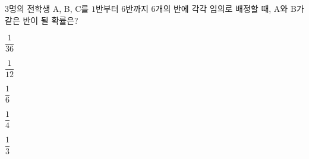 $3$명의 전학생 A, B, C를 $1$반부터 $6$반까지 $6$개의 반에 각각 임의로 배정할 때, A와 B가 같은 반이 될 확률은?
\begin{choices32}{\rule[-3ex]{0pt}{8ex}$\dfrac{1}{36}$}{\rule[-3ex]{0pt}{8ex}$\dfrac{1}{12}$}{\rule[-3ex]{0pt}{8ex}$\dfrac{1}{6}$}{\rule[-3ex]{0pt}{8ex}$\dfrac{1}{4}$}{\rule[-3ex]{0pt}{8ex}$\dfrac{1}{3}$}\end{choices32}
